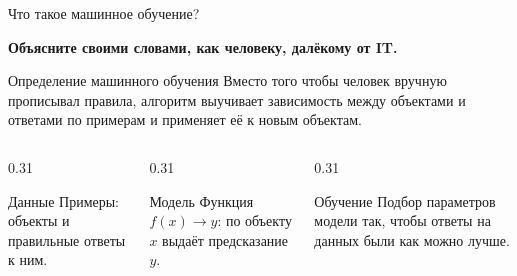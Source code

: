 \begin{frame}[c]{Что такое машинное обучение?}
  \vfill

  \medskip
  {\Large\bfseries\color{acDark} Объясните своими словами, как человеку, далёкому от IT.\par}
  \vfill
\end{frame}

\begin{frame}[c]{Определение машинного обучения}
  Вместо того чтобы человек вручную прописывал правила, алгоритм выучивает зависимость между
  объектами и ответами по примерам и применяет её к новым объектам.

  \medskip
  \begin{columns}[T]
    \begin{column}{0.31\textwidth}
      \begin{block}{Данные}
        Примеры: объекты и правильные ответы к ним.
      \end{block}
    \end{column}
    \begin{column}{0.31\textwidth}
      \begin{block}{Модель}
        Функция $f(x) \to y$: по объекту $x$ выдаёт предсказание $y$.
      \end{block}
    \end{column}
    \begin{column}{0.31\textwidth}
      \begin{block}{Обучение}
        Подбор параметров модели так, чтобы ответы на данных были как можно лучше.
      \end{block}
    \end{column}
  \end{columns}
\end{frame}

